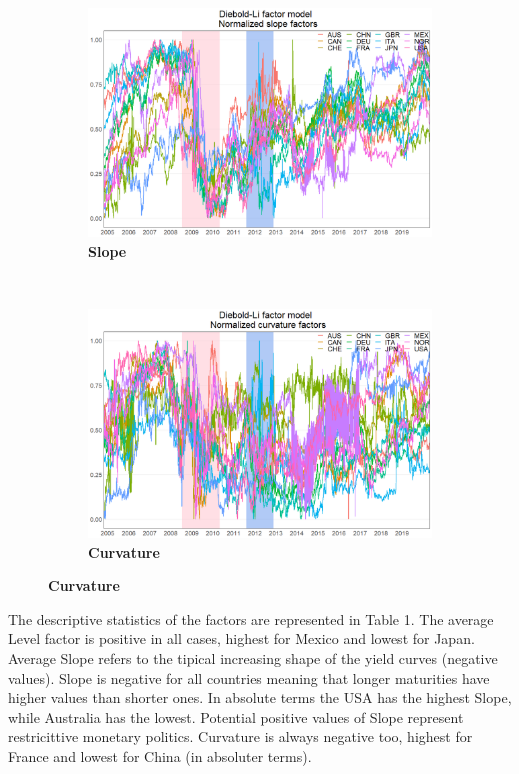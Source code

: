 \documentclass[12pt,bibliography=totoc]{article}
\begin{document}
\begin{figure}[H]
\begin{subfigure}{.5\linewidth}
\end{subfigure}%
\begin{subfigure}{.5\linewidth}
\centering
\includegraphics[width=\linewidth]{Normalizedslope}
\caption{\textbf{Slope}}
\end{subfigure}\\[1ex]
\begin{subfigure}{.5\linewidth}
\centering
\includegraphics[width=\linewidth]{Normalizedcurvature}
\caption{\textbf{Curvature}}
\end{subfigure}
\end{figure}


The descriptive statistics of the factors are represented in Table 1. The average Level factor is positive in all cases, highest for Mexico and lowest for Japan. Average Slope refers to the tipical increasing shape of the yield curves (negative values). Slope is negative for all countries meaning that longer maturities have higher values than shorter ones. In absolute terms the USA has the highest Slope, while Australia has the lowest. Potential positive values of Slope represent restricittive monetary politics. Curvature is always negative too, highest for France and lowest for China (in absoluter terms).
\end{document}
